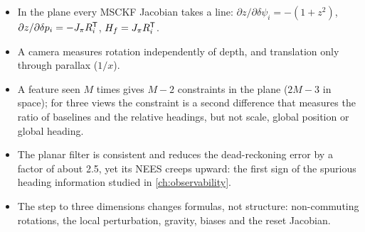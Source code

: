 \begin{takeaways}
\begin{itemize}
  \item In the plane every MSCKF Jacobian takes a line: $\partial z/\partial\delta\psi_i = -(1 + z^2)$, $\partial z/\partial\delta p_i = -J_\pi R_i^{\mathsf{T}}$, $H_f = J_\pi R_i^{\mathsf{T}}$.
  \item A camera measures rotation independently of depth, and translation only through parallax ($1/x$).
  \item A feature seen $M$ times gives $M - 2$ constraints in the plane ($2M - 3$ in space); for three views the constraint is a second difference
        that measures the ratio of baselines and the relative headings, but not scale, global position or global heading.
  \item The planar filter is consistent and reduces the dead-reckoning error by a factor of about 2.5, yet its NEES creeps upward: the first sign
        of the spurious heading information studied in \cref{ch:observability}.
  \item The step to three dimensions changes formulas, not structure: non-commuting rotations, the local perturbation, gravity, biases and the reset Jacobian.
\end{itemize}
\end{takeaways}


